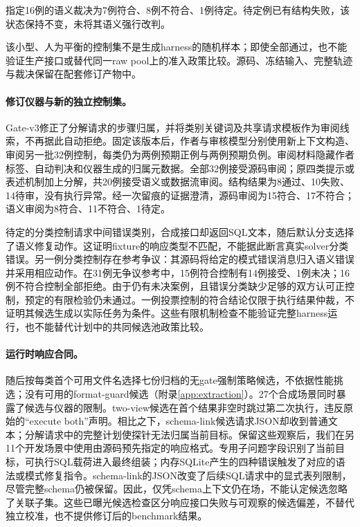 指定16例的语义裁决为7例符合、8例不符合、1例待定。待定例已有结构失败，该状态保持不变，未将其语义强行改判。

该小型、人为平衡的控制集不是生成harness的随机样本；即使全部通过，也不能验证生产接口或替代同一raw pool上的准入政策比较。源码、冻结输入、完整轨迹与裁决保留在配套修订产物中。

\paragraph{修订仪器与新的独立控制集。}
Gate-v3修正了分解请求的步骤归属，并将类别关键词及共享请求模板作为审阅线索，不再据此自动拒绝。固定该版本后，作者与审核模型分别使用新上下文构造、审阅另一批32例控制，每类仍为两例预期正例与两例预期负例。审阅材料隐藏作者标签、自动判决和仪器生成的归属元数据。全部32例接受源码审阅；原四类提示或表述机制加上分解，共20例接受语义或数据流审阅。结构结果为8通过、10失败、14待审，没有执行异常。经一次留痕的证据澄清，源码审阅为15符合、17不符合；语义审阅为8符合、11不符合、1待定。

待定的分类控制请求中间错误类别，合成接口却返回SQL文本，随后默认分支选择了语义修复动作。这证明fixture的响应类型不匹配，不能据此断言真实solver分类错误。另一例分类控制存在参考争议：其源码将给定的模式错误消息归入语义错误并采用相应动作。在31例无争议参考中，15例符合控制有14例接受、1例未决；16例不符合控制全部拒绝。由于仍有未决案例，且错误分类缺少足够的双方认可正控制，预定的有限检验仍未通过。一例投票控制的符合结论仅限于执行结果仲裁，不证明其候选生成以实际任务为条件。这些有限机制检查不能验证完整harness运行，也不能替代计划中的共同候选池政策比较。

\paragraph{运行时响应合同。}
随后按每类首个可用文件名选择七份归档的无gate强制策略候选，不依据性能挑选；没有可用的format-guard候选（附录\ref{app:extraction}）。27个合成场景同时暴露了候选与仪器的限制。two-view候选在首个结果非空时跳过第二次执行，违反原始的“execute both”声明。相比之下，schema-link候选请求JSON却收到普通文本；分解请求中的完整计划使探针无法归属当前目标。保留这些观察后，我们在另11个开发场景中使用由源码预先指定的响应格式。专用子问题字段识别了当前目标，可执行SQL载荷进入最终组装；内存SQLite产生的四种错误触发了对应的语法或模式修复指令。schema-link的JSON改变了后续SQL请求中的显式表列限制，尽管完整schema仍被保留。因此，仅凭schema上下文仍在场，不能认定候选忽略了关联子集。这些已曝光候选检查区分响应接口失败与可观察的候选偏差，不替代独立校准，也不提供修订后的benchmark结果。
